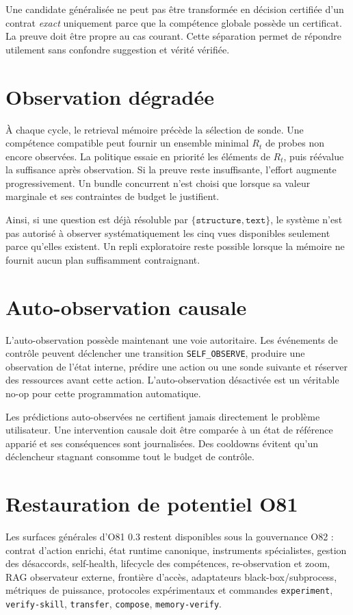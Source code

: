 \documentclass[11pt,a4paper]{report}
\begin{document}
Une candidate généralisée ne peut pas être transformée en décision certifiée d'un contrat \emph{exact} uniquement parce que la compétence globale possède un certificat. La preuve doit être propre au cas courant. Cette séparation permet de répondre utilement sans confondre suggestion et vérité vérifiée.

\section{Observation dégradée}
À chaque cycle, le retrieval mémoire précède la sélection de sonde. Une compétence compatible peut fournir un ensemble minimal $R_t$ de probes non encore observées. La politique essaie en priorité les éléments de $R_t$, puis réévalue la suffisance après observation. Si la preuve reste insuffisante, l'effort augmente progressivement. Un bundle concurrent n'est choisi que lorsque sa valeur marginale et ses contraintes de budget le justifient.

Ainsi, si une question est déjà résoluble par $\{\texttt{structure},\texttt{text}\}$, le système n'est pas autorisé à observer systématiquement les cinq vues disponibles seulement parce qu'elles existent. Un repli exploratoire reste possible lorsque la mémoire ne fournit aucun plan suffisamment contraignant.

\section{Auto-observation causale}
L'auto-observation possède maintenant une voie autoritaire. Les événements de contrôle peuvent déclencher une transition \texttt{SELF\_OBSERVE}, produire une observation de l'état interne, prédire une action ou une sonde suivante et réserver des ressources avant cette action. L'auto-observation désactivée est un véritable no-op pour cette programmation automatique.

Les prédictions auto-observées ne certifient jamais directement le problème utilisateur. Une intervention causale doit être comparée à un état de référence apparié et ses conséquences sont journalisées. Des cooldowns évitent qu'un déclencheur stagnant consomme tout le budget de contrôle.

\section{Restauration de potentiel O81}
Les surfaces générales d'O81 0.3 restent disponibles sous la gouvernance O82 : contrat d'action enrichi, état runtime canonique, instruments spécialistes, gestion des désaccords, self-health, lifecycle des compétences, re-observation et zoom, RAG observateur externe, frontière d'accès, adaptateurs black-box/subprocess, métriques de puissance, protocoles expérimentaux et commandes \texttt{experiment}, \texttt{verify-skill}, \texttt{transfer}, \texttt{compose}, \texttt{memory-verify}.
\end{document}
